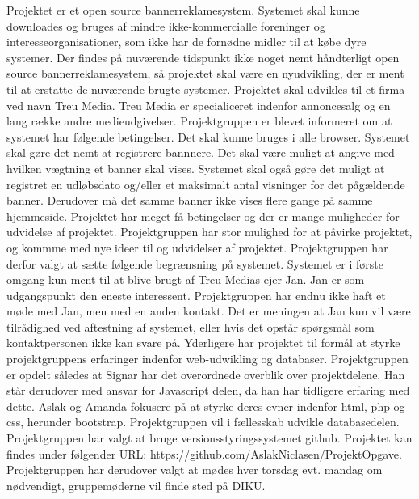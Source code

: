 \documentclass[a4paper,12pt]{article}
\begin{document}
Projektet er et open source bannerreklamesystem. Systemet skal kunne downloades og bruges af mindre ikke-kommercialle foreninger og interesseorganisationer, som ikke har de fornødne midler til at købe dyre systemer. Der findes på nuværende tidspunkt ikke noget nemt håndterligt open source bannerreklamesystem, så projektet skal være en nyudvikling, der er ment til at erstatte de nuværende brugte systemer. Projektet skal udvikles til et firma ved navn Treu Media. Treu Media er specialiceret indenfor annoncesalg og en lang række andre medieudgivelser. 
\newline
\newline
Projektgruppen er blevet informeret om at systemet har følgende betingelser. Det skal kunne bruges i alle browser. Systemet skal gøre det nemt at registrere bannnere. Det skal være muligt at angive med hvilken vægtning et banner skal vises. Systemet skal også gøre det muligt at registret en udløbsdato og/eller et maksimalt antal visninger for det pågældende banner. Derudover må det samme banner ikke vises flere gange på samme hjemmeside. 
Projektet har meget få betingelser og der er mange muligheder for udvidelse af projektet. Projektgruppen har stor mulighed for at påvirke projektet, og kommme med nye ideer til og udvidelser af projektet.
Projektgruppen har derfor valgt at sætte følgende begrænsning på systemet. Systemet er i første omgang kun ment til at blive brugt af Treu Medias ejer Jan. Jan er som udgangspunkt den eneste interessent.
\newline
\newline
Projektgruppen har endnu ikke haft et møde med Jan, men med en anden kontakt. Det er meningen at Jan kun vil være tilrådighed ved aftestning af systemet, eller hvis det opstår spørgsmål som kontaktpersonen ikke kan svare på. 
\newline
\newline
Yderligere har projektet til formål at styrke projektgruppens erfaringer indenfor web-udwikling og databaser.
Projektgruppen er opdelt således at Signar har det overordnede overblik over projektdelene. Han står derudover med ansvar for Javascript delen, da han har tidligere erfaring med dette. Aslak og Amanda fokusere på at styrke deres evner indenfor html, php og css, herunder bootstrap. Projektgruppen vil i fællesskab udvikle databasedelen.
\newline
\newline
Projektgruppen har valgt at bruge versionsstyringssystemet github. 
Projektet kan findes under følgender URL: https://github.com/AslakNiclasen/ProjektOpgave. Projektgruppen har derudover valgt at mødes hver torsdag evt. mandag om nødvendigt, gruppemøderne vil finde sted på DIKU. 
\newline
\newline 
\end{document}
